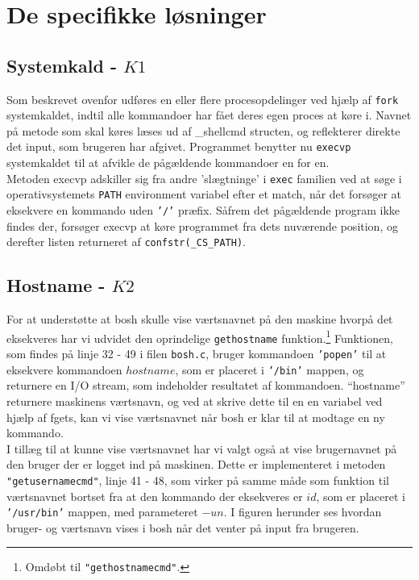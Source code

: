 \documentclass[final]{article}
\begin{document}
\section{De specifikke løsninger}

\subsection{Systemkald - $K1$}
Som beskrevet ovenfor udføres en eller flere procesopdelinger ved hjælp af \texttt{fork} systemkaldet, indtil alle kommandoer har fået deres egen proces at køre i. Navnet på metode som skal køres læses ud af \_shellcmd structen, og reflekterer direkte det input, som brugeren har afgivet. Programmet benytter nu \texttt{execvp} systemkaldet til at afvikle de pågældende kommandoer en for en.\\

Metoden execvp adskiller sig fra andre 'slægtninge' i \texttt{exec} familien ved at søge i operativsystemets \texttt{PATH} environment variabel efter et match, når det forsøger at eksekvere en kommando uden \texttt{'/'} præfix. Såfrem det pågældende program ikke findes der, forsøger execvp at køre programmet fra dets nuværende position, og derefter listen returneret af \texttt{confstr(\_CS\_PATH)}.

\subsection{Hostname - $K2$}
For at understøtte at bosh skulle vise værtsnavnet på den maskine hvorpå det eksekveres har vi udvidet den oprindelige \texttt{gethostname} funktion.\footnote{Omdøbt til \texttt{"gethostnamecmd"}.}  Funktionen, som findes på linje 32 - 49 i filen \texttt{bosh.c}, bruger kommandoen \texttt{'popen'} til at eksekvere kommandoen $hostname$, som er placeret i \texttt{'/bin'} mappen, og returnere en I/O stream, som indeholder resultatet af kommandoen. “hostname” returnere maskinens værtsnavn, og ved at skrive dette til en en variabel ved hjælp af fgets, kan vi vise værtsnavnet når bosh er klar til at modtage en ny kommando.\\
I tillæg til at kunne vise værtsnavnet har vi valgt også at vise brugernavnet på den bruger der er logget ind på maskinen. Dette er implementeret i metoden \texttt{"getusernamecmd"}, linje 41 - 48, som virker på samme måde som funktion til værtsnavnet bortset fra at den kommando der eksekveres er $id$, som er placeret i \texttt{'/usr/bin'} mappen, med parameteret $-un$. I figuren herunder ses hvordan bruger- og værtsnavn vises i bosh når det venter på input fra brugeren. 
\end{document}

